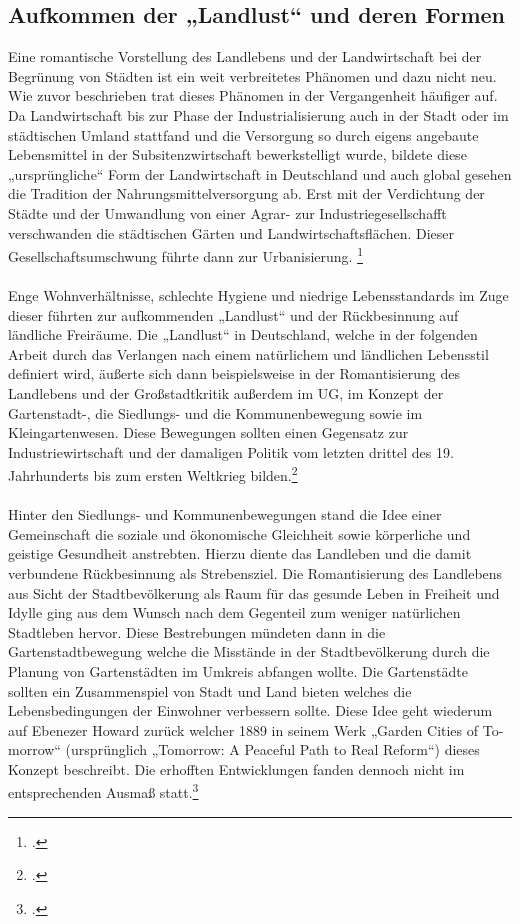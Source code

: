 \documentclass{scrartcl}
\begin{document}
\subsection{Aufkommen der „Landlust“ und deren Formen}
Eine romantische Vorstellung des Landlebens und der Landwirtschaft bei der Begrünung von Städten ist ein weit verbreitetes Phänomen und dazu nicht neu. Wie zuvor beschrieben trat dieses Phänomen in der Vergangenheit häufiger auf. Da Landwirtschaft bis zur Phase der Industrialisierung auch in der Stadt oder im städtischen Umland stattfand und die Versorgung so durch eigens angebaute Lebensmittel in der Subsitenzwirtschaft bewerkstelligt wurde, bildete diese „ursprüngliche“ Form der Landwirtschaft in Deutschland und auch global gesehen die Tradition der Nahrungsmittelversorgung ab. Erst mit der Verdichtung der Städte und der Umwandlung von einer Agrar- zur Industriegesellschafft verschwanden die städtischen Gärten und Landwirtschaftsflächen. Dieser Gesellschaftsumschwung führte dann zur Urbanisierung. \footcite[Vgl.][S. 32ff]{Egnolff2015DieIdeal}\\
\\
Enge Wohnverhältnisse, schlechte Hygiene und niedrige Lebensstandards im Zuge dieser führten zur aufkommenden „Landlust“ und der Rückbesinnung auf ländliche Freiräume. Die „Landlust“ in Deutschland, welche in der folgenden Arbeit durch das Verlangen nach einem natürlichem und ländlichen Lebensstil definiert wird, äußerte sich dann beispielsweise in der Romantisierung des Landlebens und der Großstadtkritik außerdem im UG, im Konzept der Gartenstadt-, die Siedlungs- und die Kommunenbewegung sowie im Kleingartenwesen. Diese Bewegungen sollten einen Gegensatz zur Industriewirtschaft und der damaligen Politik vom letzten drittel des 19. Jahrhunderts bis zum ersten Weltkrieg bilden.\footcite[Vgl.][S. 35]{Egnolff2015DieIdeal}\\
\\
Hinter den Siedlungs- und Kommunenbewegungen stand die Idee einer Gemeinschaft die soziale und ökonomische Gleichheit sowie körperliche und geistige Gesundheit anstrebten. Hierzu diente das Landleben und die damit verbundene Rückbesinnung als Strebensziel. Die Romantisierung des Landlebens aus Sicht der Stadtbevölkerung als Raum für das gesunde Leben in Freiheit und Idylle ging aus dem Wunsch nach dem Gegenteil zum weniger natürlichen Stadtleben hervor. Diese Bestrebungen mündeten dann in die Gartenstadtbewegung welche die Misstände in der Stadtbevölkerung durch die Planung von Gartenstädten im Umkreis abfangen wollte. Die Gartenstädte sollten ein Zusammenspiel von Stadt und Land bieten welches die Lebensbedingungen der Einwohner verbessern sollte. Diese Idee geht wiederum auf Ebenezer Howard zurück welcher 1889 in seinem Werk „Garden Cities of To-morrow“ (ursprünglich „Tomorrow: A Peaceful Path to Real Reform“) dieses Konzept beschreibt. Die erhofften Entwicklungen fanden dennoch nicht im entsprechenden Ausmaß statt.\footcite[Vgl.][S. 36]{Egnolff2015DieIdeal}
\end{document}
